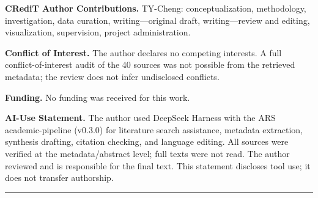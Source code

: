 \documentclass[11pt]{article}
\begin{document}
\textbf{CRediT Author Contributions.} TY-Cheng: conceptualization, methodology, investigation, data curation, writing—original draft, writing—review and editing, visualization, supervision, project administration.

\textbf{Conflict of Interest.} The author declares no competing interests. A full conflict-of-interest audit of the 40 sources was not possible from the retrieved metadata; the review does not infer undisclosed conflicts.

\textbf{Funding.} No funding was received for this work.

\textbf{AI-Use Statement.} The author used DeepSeek Harness with the ARS academic-pipeline (v0.3.0) for literature search assistance, metadata extraction, synthesis drafting, citation checking, and language editing. All sources were verified at the metadata/abstract level; full texts were not read. The author reviewed and is responsible for the final text. This statement discloses tool use; it does not transfer authorship.

\par\medskip\hrule\medskip
\end{document}
